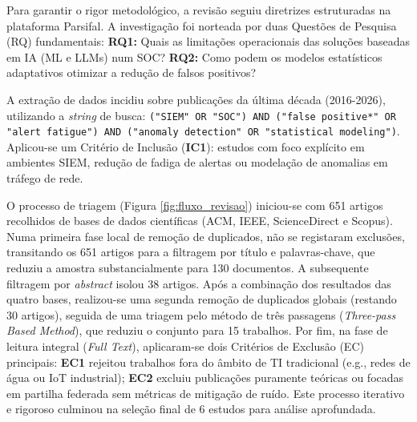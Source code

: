 \documentclass[12pt,a4paper]{article}
\begin{document}
Para garantir o rigor metodológico, a revisão seguiu diretrizes estruturadas na plataforma Parsifal. A investigação foi norteada por duas Questões de Pesquisa (RQ) fundamentais: \textbf{RQ1:} Quais as limitações operacionais das soluções baseadas em IA (ML e LLMs) num SOC? \textbf{RQ2:} Como podem os modelos estatísticos adaptativos otimizar a redução de falsos positivos? 

A extração de dados incidiu sobre publicações da última década (2016-2026), utilizando a \textit{string} de busca: \texttt{("SIEM" OR "SOC") AND ("false positive*" OR "alert fatigue") AND ("anomaly detection" OR "statistical modeling")}. Aplicou-se um Critério de Inclusão (\textbf{IC1}): estudos com foco explícito em ambientes SIEM, redução de fadiga de alertas ou modelação de anomalias em tráfego de rede. 

O processo de triagem (Figura \ref{fig:fluxo_revisao}) iniciou-se com 651 artigos recolhidos de bases de dados científicas (ACM, IEEE, ScienceDirect e Scopus). Numa primeira fase local de remoção de duplicados, não se registaram exclusões, transitando os 651 artigos para a filtragem por título e palavras-chave, que reduziu a amostra substancialmente para 130 documentos. A subsequente filtragem por \textit{abstract} isolou 38 artigos. Após a combinação dos resultados das quatro bases, realizou-se uma segunda remoção de duplicados globais (restando 30 artigos), seguida de uma triagem pelo método de três passagens (\textit{Three-pass Based Method}), que reduziu o conjunto para 15 trabalhos. Por fim, na fase de leitura integral (\textit{Full Text}), aplicaram-se dois Critérios de Exclusão (EC) principais: \textbf{EC1} rejeitou trabalhos fora do âmbito de TI tradicional (e.g., redes de água ou IoT industrial); \textbf{EC2} excluiu publicações puramente teóricas ou focadas em partilha federada sem métricas de mitigação de ruído. Este processo iterativo e rigoroso culminou na seleção final de 6 estudos para análise aprofundada.
\end{document}
